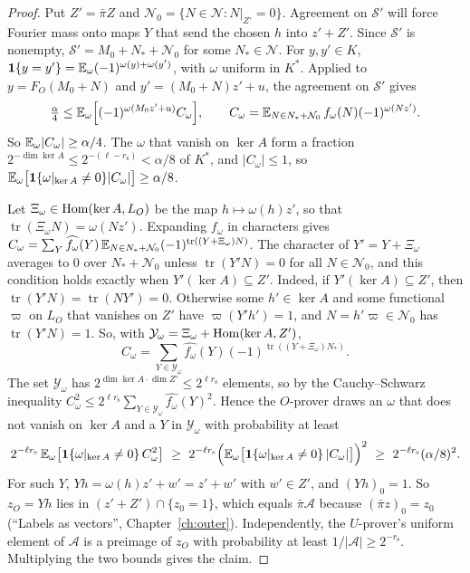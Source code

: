 \begin{proof}
Put $Z'=\bar\pi Z$ and $\mathcal N_0=\{N\in\mathcal N:N|_{Z'}=0\}$. Agreement on $\mathcal S'$ will force Fourier mass onto maps $Y$ that send the chosen $h$ into $z'+Z'$. Since $\mathcal S'$ is nonempty, $\mathcal S'=M_0+N_*+\mathcal N_0$ for some $N_*\in\mathcal N$. For $y,y'\in K$, $\mathbf{1}\{y=y'\}=\mathbb{E}_\omega(-1)^{\omega(y)+\omega(y')}$, with $\omega$ uniform in $K^*$. Applied to $y=F_O(M_0+N)$ and $y'=(M_0+N)z'+u$, the agreement on $\mathcal S'$ gives
\[
\tfrac\alpha4\le\mathbb{E}_\omega\Bigl[(-1)^{\omega(M_0z'+u)}C_\omega\Bigr],\qquad C_\omega=\mathbb{E}_{N\in N_*+\mathcal N_0}\,f_\omega(N)(-1)^{\omega(Nz')}.
\]
So $\mathbb{E}_\omega|C_\omega|\ge\alpha/4$. The $\omega$ that vanish on $\ker A$ form a fraction $2^{-\dim\ker A}\le2^{-(\ell-r_{\mathrm s})}<\alpha/8$ of $K^*$, and $|C_\omega|\le1$, so $\mathbb{E}_\omega\bigl[\mathbf{1}\{\omega|_{\ker A}\ne0\}|C_\omega|\bigr]\ge\alpha/8$.

Let $\Xi_\omega\in\operatorname{Hom}(\ker A,L_O)$ be the map $h\mapsto\omega(h)z'$, so that $\operatorname{tr}(\Xi_\omega N)=\omega(Nz')$. Expanding $f_\omega$ in characters gives $C_\omega=\sum_Y\widehat{f_\omega}(Y)\,\mathbb{E}_{N\in N_*+\mathcal N_0}(-1)^{\operatorname{tr}((Y+\Xi_\omega)N)}$. The character of $Y'=Y+\Xi_\omega$ averages to $0$ over $N_*+\mathcal N_0$ unless $\operatorname{tr}(Y'N)=0$ for all $N\in\mathcal N_0$, and this condition holds exactly when $Y'(\ker A)\subseteq Z'$. Indeed, if $Y'(\ker A)\subseteq Z'$, then $\operatorname{tr}(Y'N)=\operatorname{tr}(NY')=0$. Otherwise some $h'\in\ker A$ and some functional $\varpi$ on $L_O$ that vanishes on $Z'$ have $\varpi(Y'h')=1$, and $N=h'\varpi\in\mathcal N_0$ has $\operatorname{tr}(Y'N)=1$. So, with $\mathcal Y_\omega=\Xi_\omega+\operatorname{Hom}(\ker A,Z')$,
\[
C_\omega=\sum_{Y\in\mathcal Y_\omega}\widehat{f_\omega}(Y)(-1)^{\operatorname{tr}((Y+\Xi_\omega)N_*)}.
\]
The set $\mathcal Y_\omega$ has $2^{\dim\ker A\cdot\dim Z'}\le2^{\ell r_{\mathrm s}}$ elements, so by the Cauchy--Schwarz inequality $C_\omega^2\le2^{\ell r_{\mathrm s}}\sum_{Y\in\mathcal Y_\omega}\widehat{f_\omega}(Y)^2$. Hence the $O$-prover draws an $\omega$ that does not vanish on $\ker A$ and a $Y$ in $\mathcal Y_\omega$ with probability at least
\[
2^{-\ell r_{\mathrm s}}\,\mathbb{E}_\omega\bigl[\mathbf{1}\{\omega|_{\ker A}\ne0\}\,C_\omega^2\bigr]\ \ge\ 2^{-\ell r_{\mathrm s}}\Bigl(\mathbb{E}_\omega\bigl[\mathbf{1}\{\omega|_{\ker A}\ne0\}\,|C_\omega|\bigr]\Bigr)^2\ \ge\ 2^{-\ell r_{\mathrm s}}(\alpha/8)^2.
\]
For such $Y$, $Yh=\omega(h)z'+w'=z'+w'$ with $w'\in Z'$, and $(Yh)_0=1$. So $z_O=Yh$ lies in $(z'+Z')\cap\{z_0=1\}$, which equals $\bar\pi\mathcal A$ because $(\bar\pi z)_0=z_0$ (``Labels as vectors'', Chapter~\ref{ch:outer}). Independently, the $U$-prover's uniform element of $\mathcal A$ is a preimage of $z_O$ with probability at least $1/|\mathcal A|\ge2^{-r_{\mathrm s}}$. Multiplying the two bounds gives the claim.
\end{proof}

